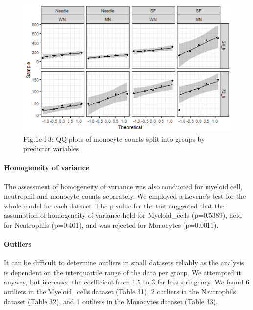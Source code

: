 \documentclass[
  12pt,
  letterpaper,
]{article}
\begin{document}
\begin{figure}[H]

{\centering \includegraphics[width=0.95\linewidth,]{Statistics_report_files/figure-latex/qq-plot-figure-1e-f-monocytes-1} 

}

\caption{Fig.1e-f-3: QQ-plots of monocyte counts split into groups by predictor variables}\label{fig:qq-plot-figure-1e-f-monocytes}
\end{figure}

\paragraph{Homogeneity of variance}\label{homogeneity-of-variance-1}

The assessment of homogeneity of variance was also conducted for myeloid cell, neutrophil and monocyte counts separately. We employed a Levene's test for the whole model for each dataset. The p-value for the test suggested that the assumption of homogeneity of variance held for Myeloid\_cells (p=0.5389), held for Neutrophils (p=0.401), and was rejected for Monocytes (p=0.0011).

\paragraph{Outliers}\label{outliers-1}

It can be difficult to determine outliers in small datasets reliably as the analysis is dependent on the interquartile range of the data per group. We attempted it anyway, but increased the coefficient from 1.5 to 3 for less stringency. We found 6 outliers in the Myeloid\_cells dataset (Table 31), 2 outliers in the Neutrophils dataset (Table 32), and 1 outliers in the Monocytes dataset (Table 33).
\end{document}
